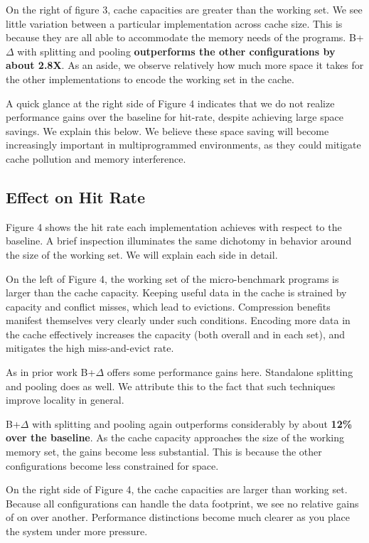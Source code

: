 \documentclass[pageno]{jpaper}
\begin{document}
On the right of figure 3, cache capacities are greater than the working set. We see little variation between a particular implementation across cache size. This is because they are all able to accommodate the memory needs of the programs. B+$\Delta$ with splitting and pooling \textbf{outperforms the other configurations by about 2.8X}. As an aside, we observe relatively how much more space it takes for the other implementations to encode the working set in the cache.

A quick glance at the right side of Figure 4 indicates that we do not realize performance gains over the baseline for hit-rate, despite achieving large space savings. We explain this below. We believe these space saving will become increasingly important in multiprogrammed environments, as they could mitigate cache pollution and memory interference.

\subsection{Effect on Hit Rate}

Figure 4 shows the hit rate each implementation achieves with respect to the baseline. A brief inspection illuminates the same dichotomy in behavior around the size of the working set. We will explain each side in detail. 

On the left of Figure 4, the working set of the micro-benchmark programs is larger than the cache capacity. Keeping useful data in the cache is strained by capacity and conflict misses, which lead to evictions. Compression benefits manifest themselves very clearly under such conditions. Encoding more data in the cache effectively increases the capacity (both overall and in each set), and mitigates the high miss-and-evict rate.

As in prior work B+$\Delta$ offers some performance gains here. Standalone splitting and pooling does as well. We attribute this to the fact that such techniques improve locality in general.

B+$\Delta$ with splitting and pooling again outperforms considerably by about \textbf{12\% over the baseline}. As the cache capacity approaches the size of the working memory set, the gains become less substantial. This is because the other configurations become less constrained for space.

On the right side of Figure 4, the cache capacities are larger than working set. Because all configurations can handle the data footprint, we see no relative gains of on over another. Performance distinctions become much clearer as you place the system under more pressure.
\end{document}
